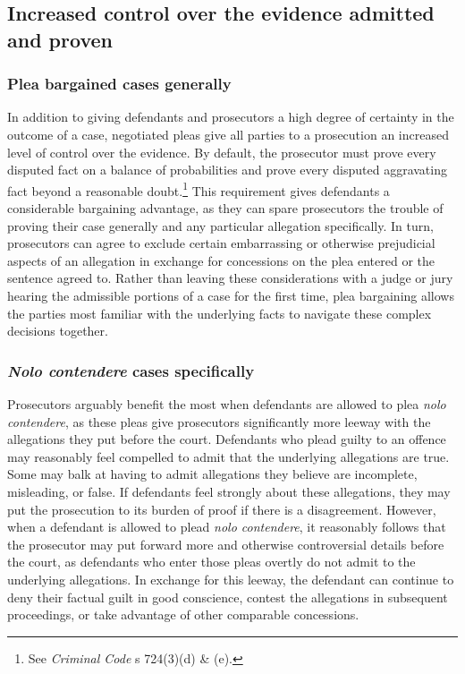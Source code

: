 \subsection{Increased control over the evidence admitted and proven}

\subsubsection{Plea bargained cases generally}

In addition to giving defendants and prosecutors a high degree of certainty in the outcome of a case, negotiated pleas give all parties to a prosecution an increased level of control over the evidence. By default, the prosecutor must prove every disputed fact on a balance of probabilities and prove every disputed aggravating fact beyond a reasonable doubt.\footnote{See \textit{Criminal Code} s 724(3)(d) \& (e).} This requirement gives defendants a considerable bargaining advantage, as they can spare prosecutors the trouble of proving their case generally and any particular allegation specifically. In turn, prosecutors can agree to exclude certain embarrassing or otherwise prejudicial aspects of an allegation in exchange for concessions on the plea entered or the sentence agreed to. Rather than leaving these considerations with a judge or jury hearing the admissible portions of a case for the first time, plea bargaining allows the parties most familiar with the underlying facts to navigate these complex decisions together.

\subsubsection{\textit{Nolo contendere} cases specifically}

Prosecutors arguably benefit the most when defendants are allowed to plea \textit{nolo contendere}, as these pleas give prosecutors significantly more leeway with the allegations they put before the court. Defendants who plead guilty to an offence may reasonably feel compelled to admit that the underlying allegations are true. Some may balk at having to admit allegations they believe are incomplete, misleading, or false. If defendants feel strongly about these allegations, they may put the prosecution to its burden of proof if there is a disagreement. However, when a defendant is allowed to plead \textit{nolo contendere}, it reasonably follows that the prosecutor may put forward more and otherwise controversial details before the court, as defendants who enter those pleas overtly do not admit to the underlying allegations. In exchange for this leeway, the defendant can continue to deny their factual guilt in good conscience, contest the allegations in subsequent proceedings, or take advantage of other comparable concessions.

